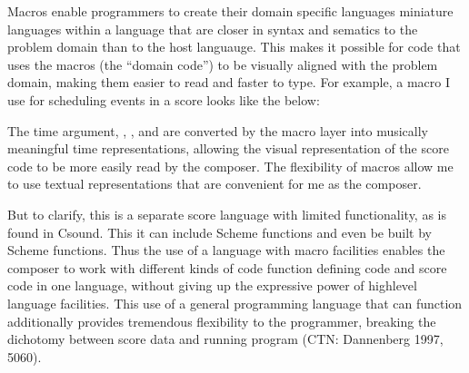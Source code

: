 \documentclass[letterpaper,10pt,english]{sphinxmanual}
\begin{document}
\sphinxAtStartPar
Macros enable programmers to create their  domain specific languages \sphinxhyphen{}
miniature languages within a language that are closer in syntax and sematics to the problem domain than to the host languauge.
This makes it possible for code that uses the macros (the “domain code”) to be visually aligned with the problem domain,
making them easier to read and faster to type.
For example, a macro I use for scheduling events in a score looks like the below:

\begin{sphinxVerbatim}[commandchars=\\\{\}]
\end{sphinxVerbatim}

\sphinxAtStartPar
The time argument, , , and  are converted by the macro layer into musically meaningful time
representations, allowing the visual representation of the score code to be more easily read by the composer.
The flexibility of macros allow me to use textual representations that are convenient for me as the composer.

\sphinxAtStartPar
But to clarify, this is  a separate score language with limited functionality, as is found in Csound.
This  \sphinxhyphen{} it can include  Scheme functions and even be built by Scheme functions.
Thus the use of a language with macro facilities enables the composer to work with different kinds of code
\sphinxhyphen{} function defining code and score code \sphinxhyphen{} in one language, without giving up the expressive power of high\sphinxhyphen{}level language
facilities. This use of a general programming language that can function additionally 
provides tremendous flexibility to the programmer, breaking the dichotomy between score data and running program  (CTN: Dannenberg 1997, 50\sphinxhyphen{}60).
\end{document}
